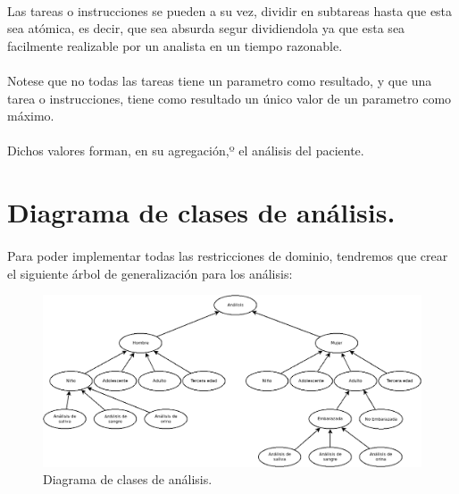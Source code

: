 \documentclass[a4paper,10pt]{article}
\begin{document}
\paragraph{}
Las tareas o instrucciones se pueden a su vez, dividir en subtareas hasta que esta sea atómica, es decir, que sea absurda segur dividiendola ya que esta sea facilmente realizable por un analista en un tiempo razonable.

\paragraph{}
Notese que no todas las tareas tiene  un parametro como resultado, y que una tarea o instrucciones, tiene como resultado un único valor de un parametro como máximo.

\paragraph{}
Dichos valores forman, en su agregación,º el análisis del paciente.



\section{Diagrama de clases de análisis.}
\paragraph{}
Para poder implementar todas las restricciones de dominio, tendremos que crear el siguiente árbol de generalización para los análisis:\\
\begin{figure}[hbt]
	\includegraphics[width=\textwidth]{diagrams/img/analisis.png}
	\caption{Diagrama de clases de análisis.}
	\label{fig:diagramaanalisis}
\end{figure}
\end{document}
